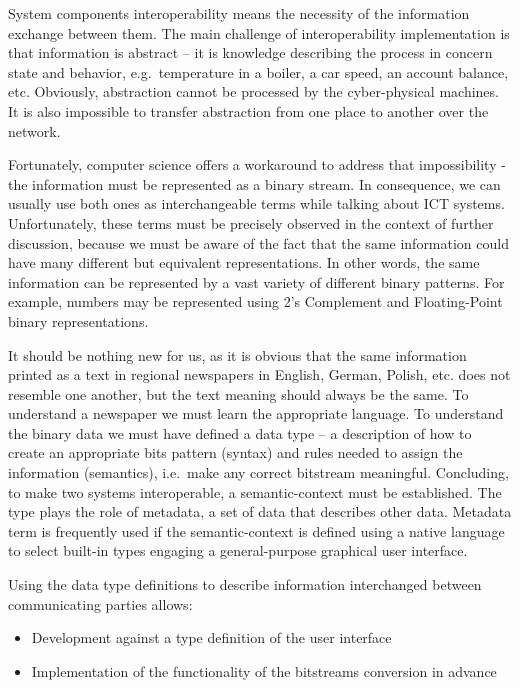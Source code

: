 \documentclass[
]{article}
\providecommand{\tightlist}{%
  \setlength{\itemsep}{0pt}\setlength{\parskip}{0pt}}
\begin{document}
System components interoperability means the necessity of the
information exchange between them. The main challenge of
interoperability implementation is that information is abstract -- it is
knowledge describing the process in concern state and behavior,
e.g.~temperature in a boiler, a car speed, an account balance, etc.
Obviously, abstraction cannot be processed by the cyber-physical
machines. It is also impossible to transfer abstraction from one place
to another over the network.

Fortunately, computer science offers a workaround to address that
impossibility - the information must be represented as a binary stream.
In consequence, we can usually use both ones as interchangeable terms
while talking about ICT systems. Unfortunately, these terms must be
precisely observed in the context of further discussion, because we must
be aware of the fact that the same information could have many different
but equivalent representations. In other words, the same information can
be represented by a vast variety of different binary patterns. For
example, numbers may be represented using 2's Complement and
Floating-Point binary representations.

It should be nothing new for us, as it is obvious that the same
information printed as a text in regional newspapers in English, German,
Polish, etc. does not resemble one another, but the text meaning should
always be the same. To understand a newspaper we must learn the
appropriate language. To understand the binary data we must have defined
a data type -- a description of how to create an appropriate bits
pattern (syntax) and rules needed to assign the information (semantics),
i.e.~make any correct bitstream meaningful. Concluding, to make two
systems interoperable, a semantic-context must be established. The type
plays the role of metadata, a set of data that describes other data.
Metadata term is frequently used if the semantic-context is defined
using a native language to select built-in types engaging a
general-purpose graphical user interface.

Using the data type definitions to describe information interchanged
between communicating parties allows:

\begin{itemize}
\tightlist
\item
  Development against a type definition of the user interface
\item
  Implementation of the functionality of the bitstreams conversion in
  advance
\end{itemize}
\end{document}
